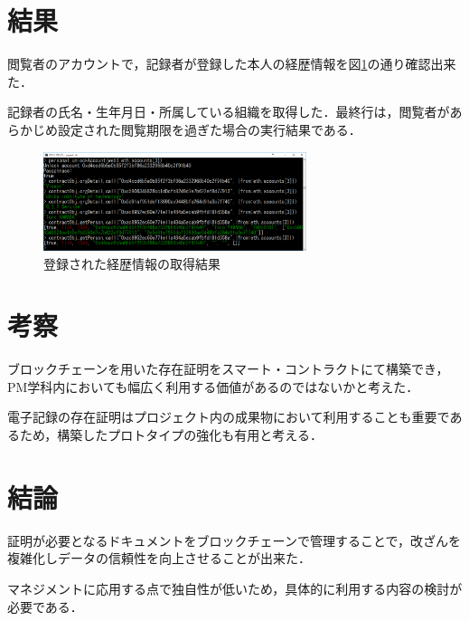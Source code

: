 \documentclass[uplatex,twocolumn,dvipdfmx]{jsarticle}
\begin{document}
\section{結果}

閲覧者のアカウントで，記録者が登録した本人の経歴情報を図\ref{code}の通り確認出来た．

記録者の氏名・生年月日・所属している組織を取得した．最終行は，閲覧者があらかじめ設定された閲覧期限を過ぎた場合の実行結果である．

\begin{figure}[htb]
\centering
\includegraphics[width=7.7cm,clip]{code.png}
\caption{登録された経歴情報の取得結果}\label{code}
\end{figure}

\section{考察}

ブロックチェーンを用いた存在証明をスマート・コントラクトにて構築でき，PM学科内においても幅広く利用する価値があるのではないかと考えた．

電子記録の存在証明はプロジェクト内の成果物において利用することも重要であるため，構築したプロトタイプの強化も有用と考える．

\section{結論}

証明が必要となるドキュメントをブロックチェーンで管理することで，改ざんを複雑化しデータの信頼性を向上させることが出来た．

マネジメントに応用する点で独自性が低いため，具体的に利用する内容の検討が必要である．


\end{document}
